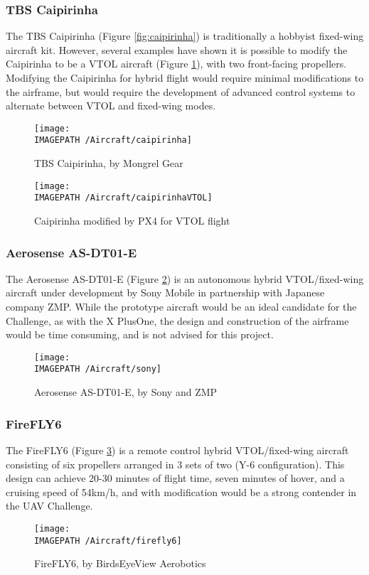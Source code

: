 \subsubsection*{TBS Caipirinha}
The TBS Caipirinha \cite{ref:caipirinha} (Figure \ref{fig:caipirinha}) is traditionally a hobbyist fixed-wing aircraft kit. However, several examples have shown it is possible to modify the Caipirinha to be a VTOL aircraft \cite{ref:caipirinhaVTOL} (Figure \ref{fig:caipirinhaVTOL}), with two front-facing propellers. Modifying the Caipirinha for hybrid flight would require minimal modifications to the airframe, but would require the development of advanced control systems to alternate between VTOL and fixed-wing modes.

\begin{figure}[!ht]
	\centering
	\begin{minipage}{.5\textwidth}
		\centering
		\texttt{[image: \\IMAGEPATH /Aircraft/caipirinha]}
		\caption{TBS Caipirinha, by Mongrel Gear}
		\label{fig:caipirinha}
	\end{minipage}%
	\begin{minipage}{.5\textwidth}
		\centering
		\texttt{[image: \\IMAGEPATH /Aircraft/caipirinhaVTOL]}
		\caption{Caipirinha modified by PX4 for VTOL flight}
		\label{fig:caipirinhaVTOL}
	\end{minipage}
\end{figure}

\subsubsection*{Aerosense AS-DT01-E}
The Aerosense AS-DT01-E \cite{ref:sony} (Figure \ref{fig:sony}) is an autonomous hybrid VTOL/fixed-wing aircraft under development by Sony Mobile in partnership with Japanese company ZMP. While the prototype aircraft would be an ideal candidate for the Challenge, as with the X PlusOne, the design and construction of the airframe would be time consuming, and is not advised for this project.

\begin{figure}[!ht]
	\centering
	\texttt{[image: \\IMAGEPATH /Aircraft/sony]}
	\caption{Aerosense AS-DT01-E, by Sony and ZMP}
	\label{fig:sony}
\end{figure}

\subsubsection*{FireFLY6}
The FireFLY6 \cite{ref:firefly6} (Figure \ref{fig:firefly6}) is a remote control hybrid VTOL/fixed-wing aircraft consisting of six propellers arranged in 3 sets of two (Y-6 configuration). This design can achieve 20-30 minutes of flight time, seven minutes of hover, and a cruising speed of 54km/h, and with modification would be a strong contender in the UAV Challenge.

\begin{figure}[!h]
	\centering
	\texttt{[image: \\IMAGEPATH /Aircraft/firefly6]}
	\caption{FireFLY6, by BirdsEyeView Aerobotics}
	\label{fig:firefly6}
\end{figure}